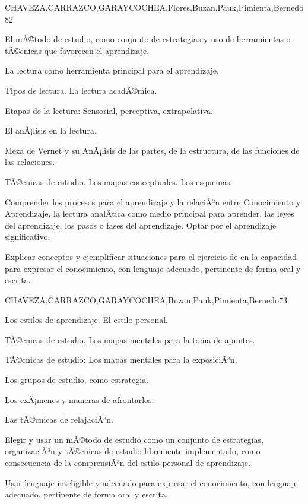 \begin{syllabus}
\begin{unit}{}{CHAVEZA,CARRAZCO,GARAYCOCHEA,Flores,Buzan,Pauk,Pimienta,Bernedo}{8}{2}
\begin{topics}
        \item El mÃ©todo de estudio, como conjunto de estrategias y uso de herramientas o tÃ©cnicas que favorecen el aprendizaje.
        \item La lectura como herramienta principal para el aprendizaje.
        \item Tipos de lectura. La lectura acadÃ©mica.
        \item Etapas de la lectura: Sensorial, perceptiva, extrapolativa.
        \item El anÃ¡lisis en la lectura.
        \item Meza de Vernet y su AnÃ¡lisis de las partes, de la estructura, de las funciones de las relaciones.
        \item TÃ©cnicas de estudio. Los mapas conceptuales. Los esquemas.
\end{topics}
\begin{unitgoals}
        \item Comprender los procesos para el aprendizaje y la relaciÃ³n entre Conocimiento y Aprendizaje, la  lectura analÃ­tica como medio principal para aprender, las leyes del aprendizaje, los pasos o fases del aprendizaje. Optar por el aprendizaje  significativo.
        \item Explicar conceptos y ejemplificar situaciones  para el ejercicio de en la capacidad para expresar el conocimiento, con lenguaje adecuado, pertinente de forma oral y escrita.
\end{unitgoals}
\end{unit}

\begin{unit}{}{CHAVEZA,CARRAZCO,GARAYCOCHEA,Buzan,Pauk,Pimienta,Bernedo}{7}{3}
\begin{topics}
        \item Los estilos de aprendizaje. El estilo personal.
        \item TÃ©cnicas de estudio. Los mapas mentales para la toma de apuntes.
        \item TÃ©cnicas de estudio: Los mapas mentales para la exposiciÃ³n.
        \item Los grupos de estudio, como estrategia.
        \item Los exÃ¡menes y maneras de afrontarlos.
        \item Las tÃ©cnicas de relajaciÃ³n.
\end{topics}
\begin{unitgoals}
        \item Elegir y usar un mÃ©todo de estudio como un conjunto de estrategias, organizaciÃ³n  y tÃ©cnicas de estudio libremente implementado, como consecuencia  de la comprensiÃ³n del estilo personal de aprendizaje.
        \item Usar lenguaje inteligible y adecuado para expresar el conocimiento, con lenguaje adecuado, pertinente de forma oral y escrita.
\end{unitgoals}
\end{unit}




\end{syllabus}
